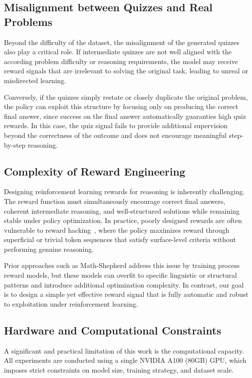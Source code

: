 \documentclass[12pt]{report}
\begin{document}
\subsection{Misalignment between Quizzes and Real Problems}
Beyond the difficulty of the dataset, the misalignment of the generated quizzes also play a critical role. If intermediate quizzes are not well aligned with the according problem difficulty or reasoning requirements, the model may receive reward signals that are irrelevant to solving the original task, leading to unreal or misdirected learning. 

Conversely, if the quizzes simply restate or closely duplicate the original problem, the policy can exploit this structure by focusing only on producing the correct final answer, since success on the final answer automatically guaranties high quiz rewards. In this case, the quiz signal fails to provide additional supervision beyond the correctness of the outcome and does not encourage meaningful step-by-step reasoning.

\subsection{Complexity of Reward Engineering}
Designing reinforcement learning rewards for reasoning is inherently challenging.
The reward function must simultaneously encourage correct final answers, coherent intermediate reasoning, and well-structured solutions while remaining stable under policy optimization. 
In practice, poorly designed rewards are often vulnerable to reward hacking~\cite{skalse2025definingcharacterizingrewardhacking}, where the policy maximizes reward through superficial or trivial token sequences that satisfy surface-level criteria without performing genuine reasoning. 

Prior approaches such as Math-Shepherd address this issue by training process reward models, but these models can overfit to specific linguistic or structural patterns and introduce additional optimization complexity\cite{wang2024mathshepherdverifyreinforcellms}. In contrast, our goal is to design a simple yet effective reward signal that is fully automatic and robust to exploitation under reinforcement learning.

\subsection{Hardware and Computational Constraints}
A significant and practical limitation of this work is the computational capacity. All experiments are conducted using a single NVIDIA A100 (80GB) GPU, which imposes strict constraints on model size, training strategy, and dataset scale.
\end{document}

